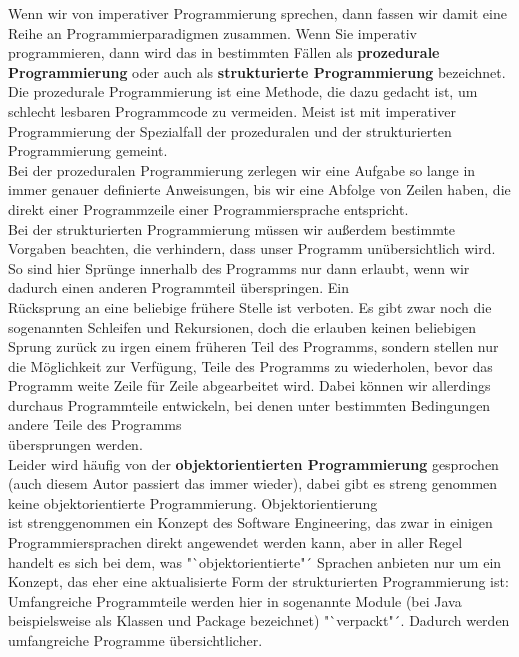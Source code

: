 Wenn wir von imperativer Programmierung sprechen, dann fassen wir damit eine Reihe an Programmierparadigmen zusammen. Wenn Sie imperativ programmieren, dann wird das in bestimmten Fällen als \textbf{prozedurale Programmierung} oder auch als \textbf{strukturierte Programmierung} bezeichnet. Die prozedurale Programmierung ist eine Methode, die dazu gedacht ist, um schlecht lesbaren Programmcode zu vermeiden. Meist ist mit imperativer Programmierung der Spezialfall der prozeduralen und der strukturierten Programmierung gemeint.\\

Bei der prozeduralen Programmierung zerlegen wir eine Aufgabe so lange in immer genauer definierte Anweisungen, bis wir eine Abfolge von Zeilen haben, die direkt einer Programmzeile einer Programmiersprache entspricht.\\

Bei der strukturierten Programmierung müssen wir außerdem bestimmte Vorgaben beachten, die verhindern, dass unser Programm unübersichtlich wird. So sind hier Sprünge innerhalb des Programms nur dann erlaubt, wenn wir dadurch einen anderen Programmteil überspringen. Ein\\
Rücksprung an eine beliebige frühere Stelle ist verboten. Es gibt zwar noch die sogenannten Schleifen und Rekursionen, doch die erlauben keinen beliebigen Sprung zurück zu irgen einem früheren Teil des Programms, sondern stellen nur die Möglichkeit zur Verfügung, Teile des Programms zu wiederholen, bevor das Programm weite Zeile für Zeile abgearbeitet wird. Dabei können wir allerdings durchaus Programmteile entwickeln, bei denen unter bestimmten Bedingungen andere Teile des Programms\\
übersprungen werden.\\

Leider wird häufig von der \textbf{objektorientierten Programmierung} gesprochen (auch diesem Autor passiert das immer wieder), dabei gibt es streng genommen keine objektorientierte Programmierung. Objektorientierung\\
ist strenggenommen ein Konzept des Software Engineering, das zwar in einigen Programmiersprachen direkt angewendet werden kann, aber in aller Regel handelt es sich bei dem, was "`objektorientierte"´ Sprachen anbieten nur um ein Konzept, das eher eine aktualisierte Form der strukturierten Programmierung ist: Umfangreiche Programmteile werden hier in sogenannte Module (bei Java beispielsweise als Klassen und Package bezeichnet) "`verpackt"´. Dadurch werden umfangreiche Programme übersichtlicher.\\

